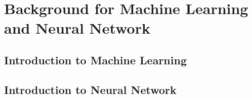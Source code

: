 \section{Background for Machine Learning and Neural Network} 

\subsection{Introduction to Machine Learning} 

\subsection{Introduction to Neural Network}
